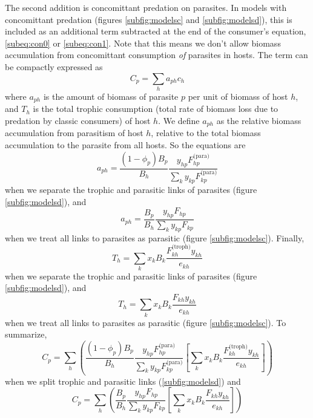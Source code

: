 \documentclass[11pt]{amsart}
\begin{document}
The second addition is concomittant predation on parasites.  In models with concomittant predation (figures \ref{subfig:modelsc} and \ref{subfig:modelsd}), this is included as an additional term subtracted at the end of the consumer's equation, \eqref{subeq:con0} or \eqref{subeq:con1}.  Note that this means we don't allow biomass accumulation from concomittant consumption \textit{of} parasites in hosts.  The term can be compactly expressed as 
\begin{equation}
C_p = \sum_ha_{ph}c_h \label{cp1}
\end{equation}
where $a_{ph}$ is the amount of biomass of parasite $p$ per unit of biomass of host $h$, and $T_h$ is the total trophic consumption (total rate of biomass loss due to predation by classic consumers) of host $h$.  We define $a_{ph}$ as the relative biomass accumulation from parasitism of host $h$, relative to the total biomass accumulation to the parasite from all hosts.  So the equations are 
\begin{equation}
a_{ph} = \frac{(1-\phi_p)B_p}{B_h}\frac{y_{hp}F^\text{(para)}_{hp}}{\sum_{k}y_{kp}F^\text{(para)}_{kp}} \label{eq:aph1}
\end{equation}
when we separate the trophic and parasitic links of parasites (figure \ref{subfig:modelsd}), and
\begin{equation}
a_{ph} = \frac{B_p}{B_h}\frac{y_{hp}F_{hp}}{\sum_{k}y_{kp}F_{kp}} \label{eq:aph0}
\end{equation}
when we treat all links to parasites as parasitic (figure \ref{subfig:modelsc}).  Finally,
\begin{equation}
T_h = \sum_kx_kB_k\frac{F^\text{(troph)}_{kh}y_{kh}}{e_{kh}} \label{eq:Th1}
\end{equation}
when we separate the trophic and parasitic links of parasites (figure \ref{subfig:modelsd}), and
\begin{equation}
T_h = \sum_kx_kB_k\frac{F_{kh}y_{kh}}{e_{kh}} \label{eq:Th0}
\end{equation}
when we treat all links to parasites as parasitic (figure \ref{subfig:modelsc}).  To summarize,
\begin{equation}
C_p = \sum_h \left(\frac{(1-\phi_p)B_p}{B_h}\frac{y_{hp}F^\text{(para)}_{hp}}{\sum_{k}y_{kp}F^\text{(para)}_{kp}}\left[\sum_kx_kB_k\frac{F^\text{(troph)}_{kh}y_{kh}}{e_{kh}}\right] \right) \label{eq:cp2}
\end{equation}
when we split trophic and parasitic links (\ref{subfig:modelsd}) and
\begin{equation}
C_p = \sum_h \left(\frac{B_p}{B_h}\frac{y_{hp}F_{hp}}{\sum_{k}y_{kp}F_{kp}}\left[\sum_kx_kB_k\frac{F_{kh}y_{kh}}{e_{kh}}\right] \right) \label{cp2}
\end{equation}
\end{document}
